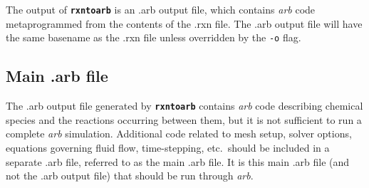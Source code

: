 \documentclass[fontsize=12pt,
               captions=abovetable,
               numbers=noenddot,
              ]{scrartcl}
\newcommand{\etc}[1][.\ ]{etc#1}
\newcommand{\rxntoarb}{\texttt{\textbf{rxntoarb}}}
\begin{document}
The output of \rxntoarb{} is an .arb output file, which contains \emph{arb} code metaprogrammed from the contents of the .rxn file. The .arb output file will have the same basename as the .rxn file unless overridden by the \texttt{-o} flag.

\subsection{Main .arb file \label{s:main}}

The .arb output file generated by \rxntoarb{} contains \emph{arb} code describing chemical species and the reactions occurring between them, but it is not sufficient to run a complete \emph{arb} simulation. Additional code related to mesh setup, solver options, equations governing fluid flow, time-stepping, \etc should be included in a separate .arb file, referred to as the main .arb file. It is this main .arb file (and not the .arb output file) that should be run through \emph{arb}.
\end{document}
